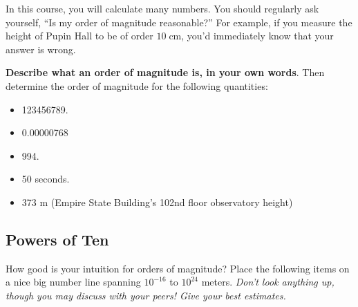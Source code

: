 \documentclass[11pt]{article}%
\newcommand*{\unit}[1]{\;\mathrm{#1}}  %
\begin{document}
In this course, you will calculate many numbers.
You should regularly ask yourself, ``Is my order of magnitude reasonable?''
For example, if you measure the height of Pupin Hall to be of order $10
\unit{cm}$, you'd immediately know that your answer is wrong.


\textbf{Describe what an order of magnitude is, in your own words}.
Then determine the order of magnitude for the following quantities:
\begin{itemize}
    \setlength\itemsep{0.2em}
    \setlength\parskip{0em}
    \item 123456789.
    \item 0.00000768
    \item 994.
    \item 50 seconds.
    \item 373 m (Empire State Building's 102nd floor observatory height) %
\end{itemize}



\subsection{Powers of Ten}

How good is your intuition for orders of magnitude?
Place the following items on a nice big number line spanning $10^{-16}$ to
$10^{24}$ meters.
\textit{Don't look anything up, though you may discuss with your peers! Give your best estimates.}
\end{document}
